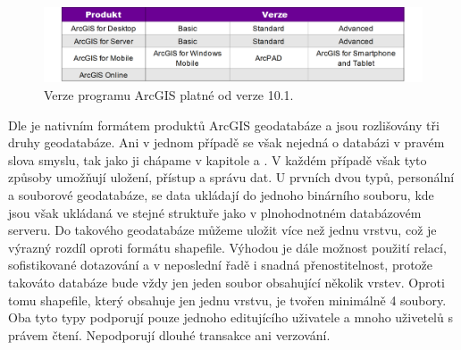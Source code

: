           \begin{figure}[H]
            \centering
            \includegraphics[width=1\textwidth]{../../../grafy/obr/tabulka_verzeArcGIS_primo.png}
            \caption{Verze programu ArcGIS platné od verze 10.1.}
          \end{figure}

        Dle \cite{Law2008} je nativním formátem produktů ArcGIS geodatabáze a
        jsou rozlišovány tři druhy geodatabáze. Ani v jednom případě se však
        nejedná o databázi v pravém slova smyslu, tak jako ji chápame v
        kapitole  a . V každém případě však tyto způsoby umožňují
        uložení, přístup a správu dat. U prvních dvou typů, personální a
        souborové geodatabáze, se data ukládají do jednoho binárního souboru,
        kde jsou však ukládaná ve stejné struktuře jako v plnohodnotném
        databázovém serveru. Do takového geodatabáze můžeme uložit více než
        jednu vrstvu, což je výrazný rozdíl oproti formátu shapefile. Výhodou
        je dále možnost použití relací, sofistikované dotazování a v neposlední
        řadě i snadná přenostitelnost, protože takováto databáze bude vždy jen
        jeden soubor obsahující několik vrstev. Oproti tomu shapefile, který
        obsahuje jen jednu vrstvu, je tvořen minimálně 4 soubory. Oba tyto typy
        podporují pouze jednoho editujícího uživatele a mnoho uživetelů s
        právem čtení. Nepodporují dlouhé transakce ani verzování. 


